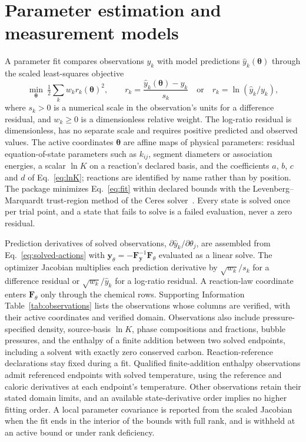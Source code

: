 \section{Parameter estimation and measurement models}
\label{sec:estimation}
A parameter fit compares observations $y_k$ with model predictions $\hat y_k(\boldsymbol\theta)$ through the scaled least-squares objective
\begin{equation}
\min_{\boldsymbol\theta}\ \tfrac12\sum_k w_k r_k(\boldsymbol\theta)^2,
\qquad r_k=\frac{\hat y_k(\boldsymbol\theta)-y_k}{s_k}\quad\text{or}\quad r_k=\ln(\hat y_k/y_k),
\label{eq:fit}
\end{equation}
where $s_k>0$ is a numerical scale in the observation's units for a difference residual, and $w_k\geq0$ is a dimensionless relative weight.
The log-ratio residual is dimensionless, has no separate scale and requires positive predicted and observed values.
The active coordinates $\boldsymbol\theta$ are affine maps of physical parameters: residual equation-of-state parameters such as $k_{ij}$, segment diameters or association energies, a scalar $\ln K$ on a reaction's declared basis, and the coefficients $a$, $b$, $c$ and $d$ of Eq.~\eqref{eq:lnK}; reactions are identified by name rather than by position.
The package minimizes Eq.~\eqref{eq:fit} within declared bounds with the Levenberg--Marquardt trust-region method of the Ceres solver~\citep{agarwalCeresSolver2023}.
Every state is solved once per trial point, and a state that fails to solve is a failed evaluation, never a zero residual.

Prediction derivatives of solved observations, $\partial\hat y_k/\partial\theta_j$, are assembled from Eq.~\eqref{eq:solved-actions} with $\mathbf{y}_\theta=-\mathbf{F}_\mathbf{y}^{-1}\mathbf{F}_\theta$ evaluated as a linear solve.
The optimizer Jacobian multiplies each prediction derivative by $\sqrt{w_k}/s_k$ for a difference residual or $\sqrt{w_k}/\hat y_k$ for a log-ratio residual.
A reaction-law coordinate enters $\mathbf{F}_\theta$ only through the chemical rows.
Supporting Information Table~\ref{tab:observations} lists the observations whose columns are verified, with their active coordinates and verified domain.
Observations also include pressure-specified density, source-basis $\ln K$, phase compositions and fractions, bubble pressures, and the enthalpy of a finite addition between two solved endpoints, including a solvent with exactly zero conserved carbon.
Reaction-reference declarations stay fixed during a fit.
Qualified finite-addition enthalpy observations admit referenced endpoints with solved temperature, using the reference and caloric derivatives at each endpoint's temperature.
Other observations retain their stated domain limits, and an available state-derivative order implies no higher fitting order.
A local parameter covariance is reported from the scaled Jacobian when the fit ends in the interior of the bounds with full rank, and is withheld at an active bound or under rank deficiency.

